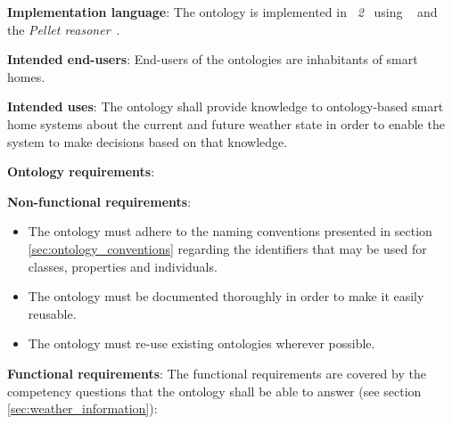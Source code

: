 \begin{mdframed}[linewidth=.6pt]
\vspace{.3cm}

\textbf{Implementation language}: The ontology is implemented in \emph{~2}~\cite{OWL} using \protege~\cite{protege} and the \emph{Pellet reasoner}~\cite{pellet}.

\vspace{.3cm}

\textbf{Intended end-users}: End-users of the ontologies are inhabitants of smart homes. %

\vspace{.3cm}

\textbf{Intended uses}: The ontology shall provide knowledge to ontology-based smart home systems about the current and future weather state in order to enable the system to make decisions based on that knowledge.

\vspace{.3cm}

\textbf{Ontology requirements}:

\vspace{.3cm}

\setlength{\leftskip}{.5cm}

\textbf{Non-functional requirements}:

\begin{itemize}
  \item The ontology must adhere to the naming conventions presented in section \ref{sec:ontology_conventions} regarding the identifiers that may be used for classes, properties and individuals.
  \item The ontology must be documented thoroughly in order to make it easily reusable.
  \item The ontology must re-use existing ontologies wherever possible.
\end{itemize}

\textbf{Functional requirements}: The functional requirements are covered by the competency questions that the ontology shall be able to answer (see section \ref{sec:weather_information}):


\end{mdframed}
